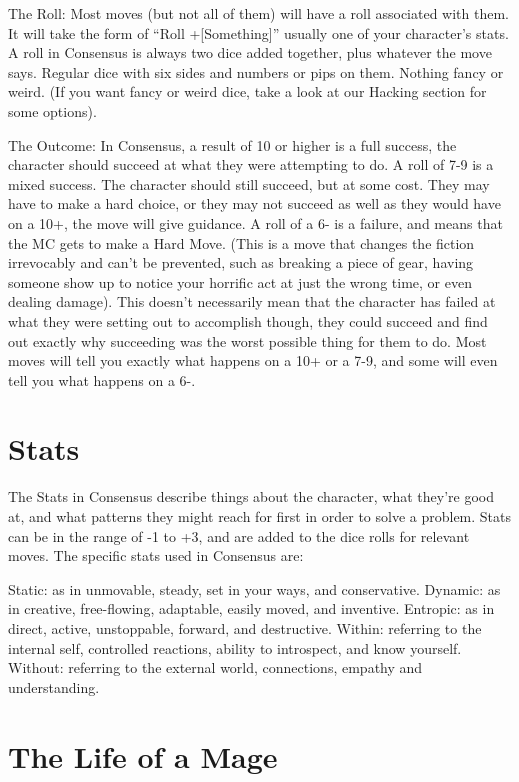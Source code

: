 \documentclass[
]{memoir}
\begin{document}
The Roll: Most moves (but not all of them) will have a roll associated
with them. It will take the form of ``Roll +{[}Something{]}'' usually
one of your character's stats. A roll in Consensus is always two dice
added together, plus whatever the move says. Regular dice with six sides
and numbers or pips on them. Nothing fancy or weird. (If you want fancy
or weird dice, take a look at our Hacking section for some options).

The Outcome: In Consensus, a result of 10 or higher is a full success,
the character should succeed at what they were attempting to do. A roll
of 7-9 is a mixed success. The character should still succeed, but at
some cost. They may have to make a hard choice, or they may not succeed
as well as they would have on a 10+, the move will give guidance. A roll
of a 6- is a failure, and means that the MC gets to make a Hard Move.
(This is a move that changes the fiction irrevocably and can't be
prevented, such as breaking a piece of gear, having someone show up to
notice your horrific act at just the wrong time, or even dealing
damage). This doesn't necessarily mean that the character has failed at
what they were setting out to accomplish though, they could succeed and
find out exactly why succeeding was the worst possible thing for them to
do. Most moves will tell you exactly what happens on a 10+ or a 7-9, and
some will even tell you what happens on a 6-.

\hypertarget{stats}{%
\section{Stats}\label{stats}}

The Stats in Consensus describe things about the character, what they're
good at, and what patterns they might reach for first in order to solve
a problem. Stats can be in the range of -1 to +3, and are added to the
dice rolls for relevant moves. The specific stats used in Consensus are:

Static: as in unmovable, steady, set in your ways, and conservative.
Dynamic: as in creative, free-flowing, adaptable, easily moved, and
inventive. Entropic: as in direct, active, unstoppable, forward, and
destructive. Within: referring to the internal self, controlled
reactions, ability to introspect, and know yourself. Without: referring
to the external world, connections, empathy and understanding.

\hypertarget{the-life-of-a-mage}{%
\section{The Life of a Mage}\label{the-life-of-a-mage}}
\end{document}
